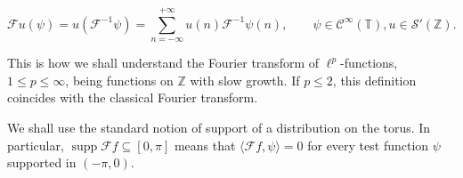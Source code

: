 \documentclass[12pt,a4paper,reqno]{amsart}
\theoremstyle{definition}
\theoremstyle{definition}\newtheorem{defn}[thm]{Definition}
\begin{document}

    \begin{equation}\label{E:distributionalFourier}
         \mathcal{F}u(\psi) =  u(\mathcal{F}^{-1}\psi) =\sum_{n=-\infty}^{+\infty} u(n) \mathcal{F}^{-1}\psi(n), \qquad \psi\in\mathcal{C}^\infty(\mathbb{T}),u\in\mathcal{S}'(\mathbb{Z}).
    \end{equation}
    

    
    This is how we shall understand the Fourier transform of $\ell^p$-functions, $1\leqslant p\leqslant \infty$, being functions on $\mathbb Z$ with slow growth. If $p\leq2$, this definition coincides with the classical Fourier transform. 
    
    We shall use the standard notion of support of a distribution on the torus. In particular,
    $\operatorname{supp}\mathcal F f\subseteq[0,\pi]$ means that
    $\langle\mathcal F f,\psi\rangle=0$ for every test function $\psi$ supported in
    $(-\pi,0)$.
    
\end{document}
